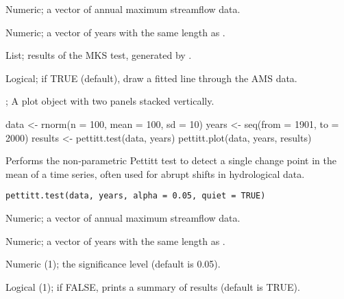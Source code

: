 \documentclass[a4paper]{book}
\begin{document}
%
\begin{Arguments}
\begin{ldescription}
\item[\code{data}] Numeric; a vector of annual maximum streamflow data.

\item[\code{years}] Numeric; a vector of years with the same length as .

\item[\code{results}] List; results of the MKS test, generated by .

\item[\code{show\_trend}] Logical; if TRUE (default), draw a fitted line through the AMS data.
\end{ldescription}
\end{Arguments}
%
\begin{Value}
; A plot object with two  panels stacked vertically.
\end{Value}
%
\begin{SeeAlso}
\end{SeeAlso}
%
\begin{Examples}
\begin{ExampleCode}
data <- rnorm(n = 100, mean = 100, sd = 10)
years <- seq(from = 1901, to = 2000)
results <- pettitt.test(data, years)
pettitt.plot(data, years, results)

\end{ExampleCode}
\end{Examples}
%
\begin{Description}
Performs the non-parametric Pettitt test to detect a single change point in the
mean of a time series, often used for abrupt shifts in hydrological data.
\end{Description}
%
\begin{Usage}
\begin{verbatim}
pettitt.test(data, years, alpha = 0.05, quiet = TRUE)
\end{verbatim}
\end{Usage}
%
\begin{Arguments}
\begin{ldescription}
\item[\code{data}] Numeric; a vector of annual maximum streamflow data.

\item[\code{years}] Numeric; a vector of years with the same length as .

\item[\code{alpha}] Numeric (1); the significance level (default is 0.05).

\item[\code{quiet}] Logical (1); if FALSE, prints a summary of results (default is TRUE).
\end{ldescription}
\end{Arguments}
\end{document}
